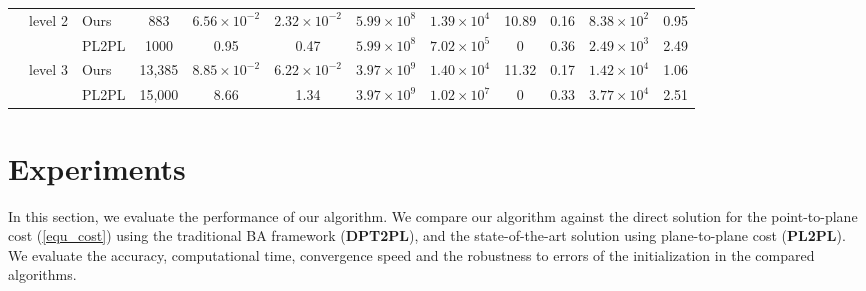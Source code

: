 \documentclass{vgtc}                          %
\begin{document}
\begin{table*}[tb]
\begin{tabular}{ c | c l c  c c | c c | c c c c}
		& \multirow{2}{*}{level 2} 
		& Ours &  883 & $6.56 \times 10^{-2}$ & $2.32 \times 10^{-2}$ &  $5.99 \times 10^8$ & $1.39 \times 10^4$ & 10.89 & 0.16 & $8.38 \times 10^2$ & 0.95\\
		& &PL2PL\cite{geneva2018lips} & 1000 & 0.95  &  0.47 &  $5.99 \times 10^8$ & $7.02 \times 10^5$ & 0 &  0.36& $2.49 \times 10^3$  & 2.49\\ \cline{2-12}
		& \multirow{2}{*}{level 3} 
		& Ours &  13,385 & $8.85 \times 10^{-2}$ & $6.22 \times 10^{-2}$& $3.97 \times 10^9$& $1.40 \times 10^4$ & 11.32 & 0.17 &  $1.42 \times 10^4$ & 1.06 \\
		& & PL2PL\cite{geneva2018lips}  & 15,000 & 8.66  & 1.34  & $3.97 \times 10^9$ & $1.02 \times 10^7$& 0 & 0.33 & $3.77 \times 10^4$ & 2.51
		\\
		\bottomrule
	\end{tabular}%
\end{table*}

\section{Experiments}



In this section, we  evaluate the performance of our algorithm.   We compare our algorithm against the direct solution for the point-to-plane cost (\ref{equ_cost}) using the traditional BA framework (\textbf{DPT2PL}), and the state-of-the-art solution \cite{geneva2018lips}  using   plane-to-plane cost (\textbf{PL2PL}). We evaluate  the accuracy, computational time, convergence speed and the robustness to  errors of the initialization in the compared algorithms. 
\end{document}
